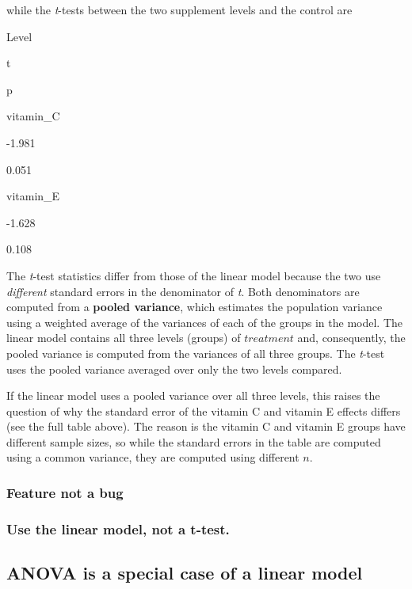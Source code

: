 \documentclass[]{book}
\begin{document}
while the \emph{t}-tests between the two supplement levels and the control are

Level

t

p

vitamin\_C

-1.981

0.051

vitamin\_E

-1.628

0.108

The \emph{t}-test statistics differ from those of the linear model because the two use \emph{different} standard errors in the denominator of \emph{t}. Both denominators are computed from a \textbf{pooled variance}, which estimates the population variance using a weighted average of the variances of each of the groups in the model. The linear model contains all three levels (groups) of \(treatment\) and, consequently, the pooled variance is computed from the variances of all three groups. The \emph{t}-test uses the pooled variance averaged over only the two levels compared.

If the linear model uses a pooled variance over all three levels, this raises the question of why the standard error of the vitamin C and vitamin E effects differs (see the full table above). The reason is the vitamin C and vitamin E groups have different sample sizes, so while the standard errors in the table are computed using a common variance, they are computed using different \(n\).

\hypertarget{feature-not-a-bug}{%
\subsubsection{Feature not a bug}\label{feature-not-a-bug}}

\hypertarget{use-the-linear-model-not-a-t-test.}{%
\subsubsection{Use the linear model, not a t-test.}\label{use-the-linear-model-not-a-t-test.}}

\hypertarget{anova-is-a-special-case-of-a-linear-model}{%
\subsection{ANOVA is a special case of a linear model}\label{anova-is-a-special-case-of-a-linear-model}}
\end{document}
